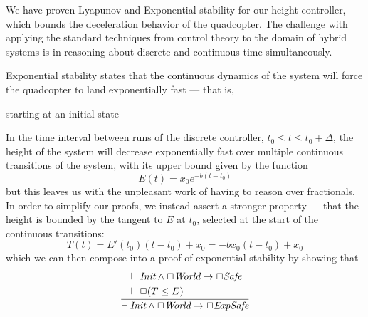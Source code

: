 \documentclass[preprint]{sigplanconf}
\begin{document}





We have proven Lyapunov and Exponential stability for our height controller, which bounds the deceleration behavior of the quadcopter. The challenge with applying the standard techniques from control theory to the domain of hybrid systems is in reasoning about discrete and continuous time simultaneously.




Exponential stability states that the continuous dynamics of the system will force the quadcopter to land exponentially fast --- that is,

starting at an initial state

In the time interval between runs of the discrete controller, $t_0\leq t \leq t_0+\Delta$, the height of the system will decrease exponentially fast over multiple continuous transitions of the system, with its upper bound given by the function
 \[E(t)=x_0e^{-b(t-t_0)}\]
but this leaves us with the unpleasant work of having to reason over fractionals. In order to simplify our proofs, we instead assert a stronger property --- that the height is bounded by the tangent to $E$ at $t_0$, selected at the start of the continuous transitions:
\[T(t) = E'(t_0)(t-t_0)+x_0 = -bx_0(t-t_0)+x_0\]
which we can then compose into a proof of exponential stability by showing that
\[
  \frac
  {\begin{aligned}
      & \vdash \emph{Init} \land \Box \emph{World} \rightarrow \Box \emph{Safe} \\
      & \vdash \Box (T\leq E)
    \end{aligned}}
  {\vdash \emph{Init} \land \Box \emph{World} \rightarrow \Box \emph{ExpSafe}}
\]
\end{document}
